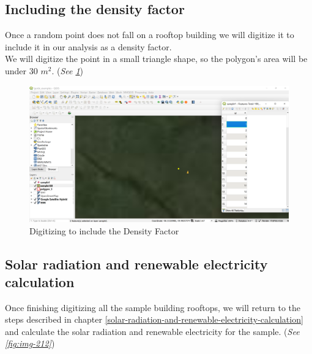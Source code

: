 \documentclass[
]{book}
\begin{document}
\hypertarget{including-the-density-factor}{%
\subsection{Including the density factor}\label{including-the-density-factor}}

Once a random point does not fall on a rooftop building we will digitize it to include it in our analysis as a density factor.\\
We will digitize the point in a small triangle shape, so the polygon's area will be under 30 \(m^2\). (\emph{See \ref{fig:img-211}})

\begin{figure}

{\centering \includegraphics[width=1\linewidth]{images/dens} 

}

\caption{Digitizing to include the Density Factor}\label{fig:img-211}
\end{figure}

\hypertarget{solar-radiation-and-renewable-electricity-calculation-1}{%
\subsection{Solar radiation and renewable electricity calculation}\label{solar-radiation-and-renewable-electricity-calculation-1}}

Once finishing digitizing all the sample building rooftops, we will return to the steps described in chapter \ref{solar-radiation-and-renewable-electricity-calculation} and calculate the solar radiation and renewable electricity for the sample. (\emph{See \ref{fig:img-212}})
\end{document}
